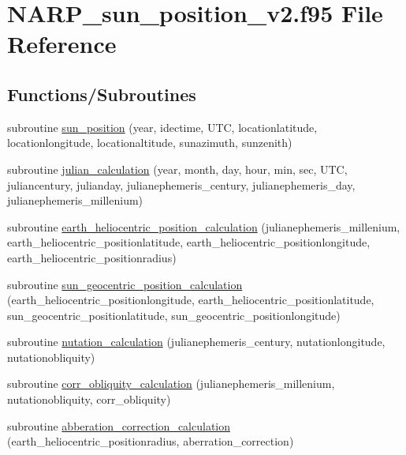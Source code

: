 \hypertarget{_n_a_r_p__sun__position__v2_8f95}{}\section{N\+A\+R\+P\+\_\+sun\+\_\+position\+\_\+v2.\+f95 File Reference}
\label{_n_a_r_p__sun__position__v2_8f95}
\subsection*{Functions/\+Subroutines}
\begin{DoxyCompactItemize}
\item 
subroutine \hyperlink{_n_a_r_p__sun__position__v2_8f95_a2b388ff5a9cd5447020b0ef32065c86b}{sun\+\_\+position} (year, idectime, U\+TC, locationlatitude, locationlongitude, locationaltitude, sunazimuth, sunzenith)
\item 
subroutine \hyperlink{_n_a_r_p__sun__position__v2_8f95_abca94c8e1d4fac1a6f3d41cb0f89157f}{julian\+\_\+calculation} (year, month, day, hour, min, sec, U\+TC, juliancentury, julianday, julianephemeris\+\_\+century, julianephemeris\+\_\+day, julianephemeris\+\_\+millenium)
\item 
subroutine \hyperlink{_n_a_r_p__sun__position__v2_8f95_a92e554f1813215c40dce31d2ce961649}{earth\+\_\+heliocentric\+\_\+position\+\_\+calculation} (julianephemeris\+\_\+millenium, earth\+\_\+heliocentric\+\_\+positionlatitude, earth\+\_\+heliocentric\+\_\+positionlongitude, earth\+\_\+heliocentric\+\_\+positionradius)
\item 
subroutine \hyperlink{_n_a_r_p__sun__position__v2_8f95_a86f9dbc3900dfe3ace869bf59bc6de68}{sun\+\_\+geocentric\+\_\+position\+\_\+calculation} (earth\+\_\+heliocentric\+\_\+positionlongitude, earth\+\_\+heliocentric\+\_\+positionlatitude, sun\+\_\+geocentric\+\_\+positionlatitude, sun\+\_\+geocentric\+\_\+positionlongitude)
\item 
subroutine \hyperlink{_n_a_r_p__sun__position__v2_8f95_afd4a13d3b6e58ce419603face1516751}{nutation\+\_\+calculation} (julianephemeris\+\_\+century, nutationlongitude, nutationobliquity)
\item 
subroutine \hyperlink{_n_a_r_p__sun__position__v2_8f95_ac86a544be72626a952ea0d3f32e1a2e6}{corr\+\_\+obliquity\+\_\+calculation} (julianephemeris\+\_\+millenium, nutationobliquity, corr\+\_\+obliquity)
\item 
subroutine \hyperlink{_n_a_r_p__sun__position__v2_8f95_ade6217dd76a6d6c6b714ece4c7d3d3e3}{abberation\+\_\+correction\+\_\+calculation} (earth\+\_\+heliocentric\+\_\+positionradius, aberration\+\_\+correction)

\end{DoxyCompactItemize}
